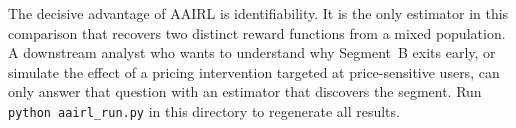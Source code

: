 \documentclass[11pt]{article}
\begin{document}
The decisive advantage of AAIRL is identifiability. It is the only estimator in this comparison that recovers two distinct reward functions from a mixed population. A downstream analyst who wants to understand why Segment~B exits early, or simulate the effect of a pricing intervention targeted at price-sensitive users, can only answer that question with an estimator that discovers the segment. Run \texttt{python aairl\_run.py} in this directory to regenerate all results.



\end{document}
